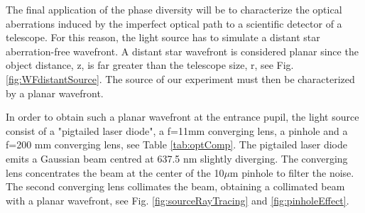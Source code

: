 The final application of the phase diversity will be to characterize the optical aberrations induced by the imperfect optical path to a scientific detector of a telescope. For this reason, the light source has to simulate a distant star aberration-free wavefront. A distant star wavefront is considered planar since the object distance, z, is far greater than the telescope size, r, see Fig. \ref{fig:WFdistantSource}. The source of our experiment must then be characterized by a planar wavefront.

In order to obtain such a planar wavefront at the entrance pupil, the light source consist of a "pigtailed laser diode", a f=11mm converging lens, a pinhole and a f=200 mm converging lens, see Table \ref{tab:optComp}. The pigtailed laser diode emits a Gaussian beam centred at 637.5 nm slightly diverging. The converging lens concentrates the beam at the center of the 10$\mu$m pinhole to filter the noise. The second converging lens collimates the beam, obtaining a collimated beam with a planar wavefront, see Fig. \ref{fig:sourceRayTracing} and \ref{fig:pinholeEffect}.

